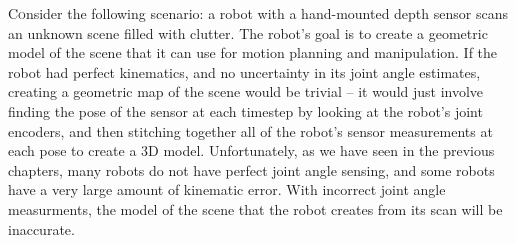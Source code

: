 \label{chap:dense_slam}
\lettrine{C}onsider the following scenario: a robot with a hand-mounted depth sensor scans an unknown scene filled with clutter. The robot's goal is to create a geometric model of the scene that it can use for motion planning and manipulation. If the robot had perfect kinematics, and no uncertainty in its joint angle estimates, creating a geometric map of the scene would be trivial -- it would just involve finding the pose of the sensor at each timestep by looking at the robot's joint encoders, and then stitching together all of the robot's sensor measurements at each pose to create a 3D model. Unfortunately, as we have seen in the previous chapters, many robots do not have perfect joint angle sensing, and some robots have a very large amount of kinematic error. With incorrect joint angle measurments, the model of the scene that the robot creates from its scan will be inaccurate.

